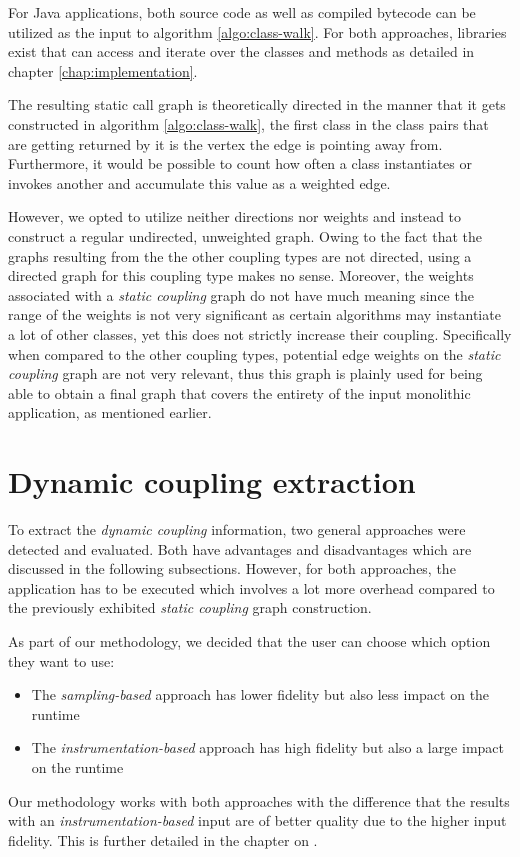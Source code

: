 \documentclass[12pt,a4paper]{report}
\begin{document}
For Java applications, both source code as well as compiled bytecode can
be utilized as the input to algorithm \ref{algo:class-walk}.
For both approaches, libraries exist that can access and iterate over
the classes and methods as detailed in chapter \ref{chap:implementation}.

The resulting static call graph is theoretically directed in the manner that it
gets constructed in algorithm \ref{algo:class-walk}, the first class in the class
pairs that are getting returned by it is the vertex the edge is pointing away from.
Furthermore, it would be possible to count how often a class instantiates or
invokes another and accumulate this value as a weighted edge.

However, we opted to utilize neither directions nor weights
and instead to construct a regular undirected, unweighted graph.
Owing to the fact that the graphs resulting from the the other coupling types
are not directed, using a directed graph for this coupling type makes no sense.
Moreover, the weights associated with a \textit{static coupling} graph
do not have much meaning since the range of the weights is not very significant
as certain algorithms may instantiate a lot of other classes,
yet this does not strictly increase their coupling.
Specifically when compared to the other coupling types, potential edge weights
on the \textit{static coupling} graph are not very relevant, thus this graph
is plainly used for being able to obtain a final graph that covers the
entirety of the input monolithic application, as mentioned earlier.



\section{Dynamic coupling extraction} \label{sect:dynamic-coupling-extraction}

To extract the \textit{dynamic coupling} information, two general approaches
were detected and evaluated. Both have advantages and disadvantages which
are discussed in the following subsections. However, for both approaches,
the application has to be executed which involves a lot more overhead compared
to the previously exhibited \textit{static coupling} graph construction.

As part of our methodology, we decided that the user can choose which option
they want to use:
\begin{itemize}[noitemsep]
  \item The \textit{sampling\hyp based} approach has lower fidelity but
        also less impact on the runtime
  \item The \textit{instrumentation\hyp based} approach has high fidelity but
        also a large impact on the runtime
\end{itemize}
Our methodology works with both approaches with the difference that the results
with an \textit{instrumentation\hyp based} input are of better quality due to the
higher input fidelity. This is further detailed in the chapter on
\textit{}.
\end{document}
